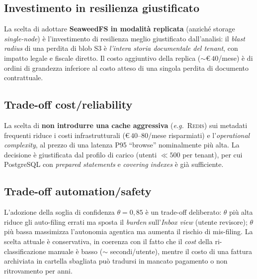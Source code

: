 \documentclass[11pt,a4paper,oneside]{article}
\begin{document}
\subsection{Investimento in resilienza giustificato}
La scelta di adottare \textbf{SeaweedFS in modalit\`a replicata} (anzich\'e
storage \emph{single-node}) \`e l'investimento di resilienza meglio
giustificato dall'analisi: il \emph{blast radius} di una perdita di blob S3 \`e
\emph{l'intera storia documentale del tenant}, con impatto legale e fiscale
diretto. Il costo aggiuntivo della replica ($\sim$\euro$\,40$/mese) \`e di
ordini di grandezza inferiore al costo atteso di una singola perdita di
documento contrattuale.

\subsection{Trade-off cost/reliability}
La scelta di \textbf{non introdurre una cache aggressiva} (\emph{e.g.}\
\textsc{Redis}) sui metadati frequenti riduce i costi infrastrutturali
(\euro$\,40$--$80$/mese risparmiati) e l'\emph{operational complexity}, al
prezzo di una latenza P95 ``browse'' nominalmente pi\`u alta. La decisione
\`e giustificata dal profilo di carico (utenti $\ll 500$ per tenant), per cui
PostgreSQL con \emph{prepared statements} e \emph{covering indexes} \`e gi\`a
sufficiente.

\subsection{Trade-off automation/safety}
L'adozione della soglia di confidenza $\theta = 0{,}85$ \`e un trade-off
deliberato: $\theta$ pi\`u alta riduce gli auto-filing errati ma sposta il
\emph{burden} sull'\emph{Inbox view} (utente revisore); $\theta$ pi\`u bassa
massimizza l'autonomia agentica ma aumenta il rischio di mis-filing. La scelta
attuale \`e conservativa, in coerenza con il fatto che il \emph{cost} della
ri-classificazione manuale \`e basso ($\sim$ secondi/utente), mentre il costo
di una fattura archiviata in cartella sbagliata pu\`o tradursi in mancato
pagamento o non ritrovamento per anni.
\end{document}
